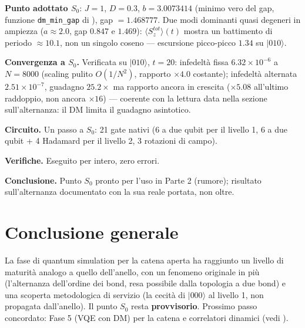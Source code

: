 \documentclass[11pt,a4paper]{article}
\newcommand{\ket}[1]{\lvert #1 \rangle}
\begin{document}
\textbf{Punto adottato $S_0$}: $J{=}1$, $D{=}0.3$, $b{=}3.0073414$ (minimo vero del
gap, funzione \texttt{dm\_min\_gap} di \texttt{}),
gap $=1.468777$. Due modi dominanti quasi degeneri in ampiezza ($a\approx2.0$, gap
$0.847$ e $1.469$): $\langle S_z^{tot}\rangle(t)$ mostra un battimento di periodo
$\approx10.1$, non un singolo coseno — escursione picco-picco $1.34$ su $\ket{010}$.

\textbf{Convergenza a $S_0$.} Verificata su $\ket{010}$, $t=20$: infedeltà fissa
$6.32\times10^{-6}$ a $N{=}8000$ (scaling pulito $O(1/N^2)$, rapporto $\times4.0$
costante); infedeltà alternata $2.51\times10^{-7}$, guadagno $25.2\times$ ma
rapporto ancora in crescita ($\times5.08$ all'ultimo raddoppio, non ancora
$\times16$) — coerente con la lettura data nella sezione sull'alternanza: il DM limita il
guadagno asintotico.

\textbf{Circuito.} Un passo a $S_0$: 21 gate nativi (6 a due qubit per il livello
1, 6 a due qubit + 4 Hadamard per il livello 2, 3 rotazioni di campo).

\textbf{Verifiche.} Eseguito per intero, zero errori.

\textbf{Conclusione.} Punto $S_0$ pronto per l'uso in Parte 2 (rumore); risultato
sull'alternanza documentato con la sua reale portata, non oltre.

\section*{Conclusione generale}

La fase di quantum simulation per la catena aperta ha raggiunto un livello di
maturità analogo a quello dell'anello, con un fenomeno originale in più
(l'alternanza dell'ordine dei bond, resa possibile dalla topologia a due bond) e
una scoperta metodologica di servizio (la cecità di $\ket{000}$ al livello 1, non
propagata dall'anello). Il punto $S_0$ resta \textbf{provvisorio}. Prossimo passo
concordato: Fase 5 (VQE con DM) per la catena e correlatori dinamici (vedi
\texttt{}).
\end{document}
